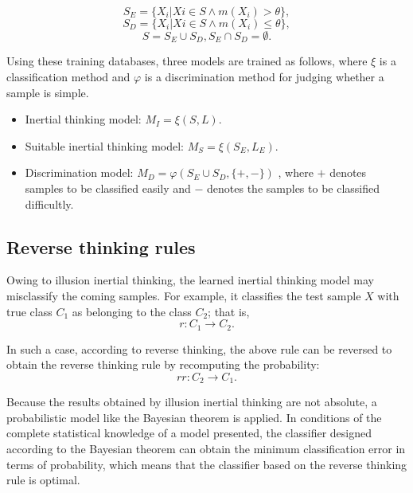 \begin{displaymath}
    S_E=\{X_i|Xi\in S \wedge m(X_i)> \theta\},
\end{displaymath}
 \begin{displaymath}
    S_D=\{X_i|Xi\in S \wedge m(X_i)\leq \theta\},
\end{displaymath}
\begin{displaymath}
    S=S_E\cup S_D, S_E\cap S_D=\emptyset.
\end{displaymath}

Using these training databases, three models are trained as follows, where $\xi$ is a classification method and $\varphi$ is a discrimination method for judging whether a sample is simple.
\begin{itemize}
\item Inertial thinking model: $M_I=\xi(S,L)$.
\item Suitable inertial thinking model: $M_S=\xi(S_E,L_E)$.
\item Discrimination model: $M_{D}=\varphi(S_E\cup S_D,\{+,-\})$ , where $+$ denotes samples to be classified easily and $-$ denotes the samples to be classified difficultly.
\end{itemize}

\subsection{Reverse thinking rules}
Owing to illusion inertial thinking, the learned inertial thinking model may misclassify the coming samples. For example, it classifies the test sample $X$ with true class $C_1$  as belonging to the class $C_2$; that is,
\begin{equation}
    r:C_1\rightarrow C_2.
\end{equation}

In such a case, according to reverse thinking, the above rule can be reversed to obtain the reverse thinking rule by recomputing the probability:
\begin{equation}
    rr:C_2\rightarrow C_1.
\end{equation}

Because the results obtained by illusion inertial thinking are not absolute, a probabilistic model like the Bayesian theorem is applied. In conditions of the complete statistical knowledge of a model presented, the classifier designed according to the Bayesian theorem can obtain the minimum classification error in terms of probability, which means that the classifier based on the reverse thinking rule is optimal.

